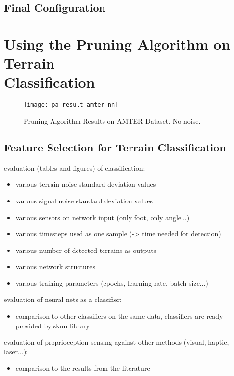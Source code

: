 \subsection{Final Configuration} \label{ssec:results_overview}


\section[Using the Pruning Algorithm on Terrain Classification]{Using the Pruning Algorithm on Terrain \\Classification} \label{sec:pa_amter}

\begin{figure}[H]
  \centering
  \texttt{[image: pa\_result\_amter\_nn]}
  \caption{Pruning Algorithm Results on AMTER Dataset. No noise.}
  \label{fig:pa_result_amter}
\end{figure}

\subsection{Feature Selection for Terrain Classification} \label{ssec:pa_amter_feature_selection}

evaluation (tables and figures) of classification:
\begin{itemize}
\item various terrain noise standard deviation values
\item various signal noise standard deviation values
\item various sensors on network input (only foot, only angle...)
\item various timesteps used as one sample (-> time needed for detection)
\item various number of detected terrains as outputs
\item various network structures
\item various training parameters (epochs, learning rate, batch size...)
\end{itemize}


evaluation of neural nets as a classifier:
\begin{itemize}
\item comparison to other classifiers on the same data, classifiers are ready provided by sknn library
\end{itemize}

evaluation of proprioception sensing against other methods (visual, haptic, laser...):
\begin{itemize}
\item comparison to the results from the literature
\end{itemize}

